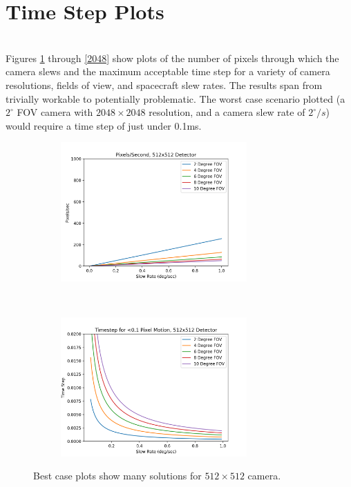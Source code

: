 \documentclass[]{DINOReportMemo}
\begin{document}
\section{Time Step Plots}\\
Figures \ref{512} through \ref{2048} show plots of the number of pixels through which the camera slews and the maximum acceptable time step for a variety of camera resolutions, fields of view, and spacecraft slew rates. The results span from trivially workable to potentially problematic. The worst case scenario plotted (a $2^\circ$ FOV camera with $2048\times2048$ resolution, and a camera slew rate of $2^\circ/s$) would require a time step of just under 0.1ms.

\begin{figure}[t!]
    \centering
    \begin{subfigure}
        \centering
        \includegraphics[height=2.1in]{512x512_pix_per_sec}
    \end{subfigure}%
    ~ 
    \begin{subfigure}
        \centering
        \includegraphics[height=2.1in]{512x512_min_dt}
    \end{subfigure}
    \caption{Best case plots show many solutions for $512\times512$ camera.}
    \label{512}
\end{figure}
\end{document}
